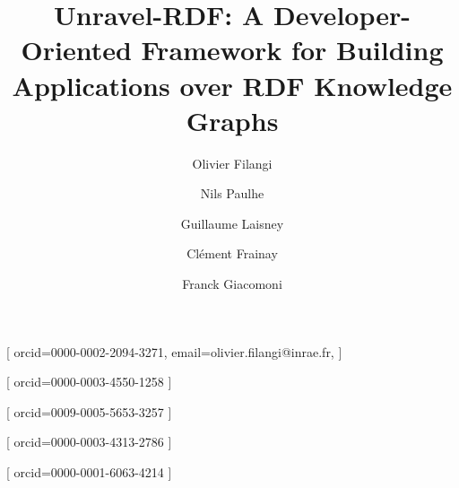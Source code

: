 \documentclass[
]{ceurart}
\begin{document}


\title{Unravel-RDF: A Developer-Oriented Framework for Building
Applications over RDF Knowledge Graphs}

\tnotemark[1]

\author[1,4]{Olivier Filangi}[%
  orcid=0000-0002-2094-3271,
  email=olivier.filangi@inrae.fr,
]

\cormark[1]

\author[2,4]{Nils Paulhe}[%
  orcid=0000-0003-4550-1258
]

\author[3,4]{Guillaume Laisney}[%
  orcid=0009-0005-5653-3257
]

\author[3,4]{Clément Frainay}[%
  orcid=0000-0003-4313-2786
]

\author[2,4]{Franck Giacomoni}[%
  orcid=0000-0001-6063-4214
]

\address[1]{Institute for Genetics, Environment and Plant Protection (IGEPP),
INRAE, Université de Rennes, Institut Agro Rennes-Angers, Le Rheu, France}

\address[2]{Human Nutrition Unit (UNH), UMR 1019 INRAE–Université d’Auvergne,
Clermont-Ferrand, France}

\address[3]{Toxalim, Research Centre in Food Toxicology, INRAE,
Université de Toulouse, ENVT, INP-Purpan, Toulouse, France}

\address[4]{MetaboHUB National Infrastructure for Metabolomics and Fluxomics,
France}

\end{document}
